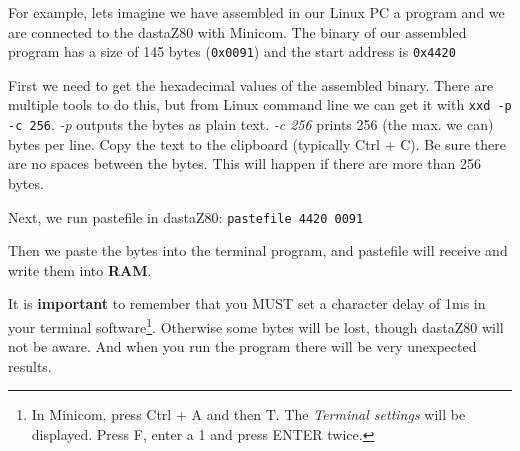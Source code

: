     For example, lets imagine we have assembled in our Linux PC a program and
    we are connected to the dastaZ80 with Minicom. The binary of our assembled
    program has a size of 145 bytes (\texttt{0x0091}) and the start address is
    \texttt{0x4420}

    First we need to get the hexadecimal values of the assembled binary. There
    are multiple tools to do this, but from Linux command line we can get it
    with \texttt{xxd -p -c 256}. \textit{-p} outputs the bytes as plain text.
    \textit{-c 256} prints 256 (the max. we can) bytes per line. Copy the text
    to the clipboard (typically Ctrl + C). Be sure there are no spaces between
    the bytes. This will happen if there are more than 256 bytes.

    Next, we run pastefile in dastaZ80: \texttt{pastefile 4420 0091}

    Then we paste the bytes into the terminal program, and pastefile will
    receive and write them into \textbf{RAM}.

    It is \textbf{important} to remember that you MUST set a character delay of
    1ms in your terminal software\footnote{In Minicom, press Ctrl + A and then
    T. The \textit{Terminal settings} will be displayed. Press F, enter a 1 and
    press ENTER twice.}. Otherwise some bytes will be lost, though
    dastaZ80 will not be aware. And when you run the program there will be very
    unexpected results.




